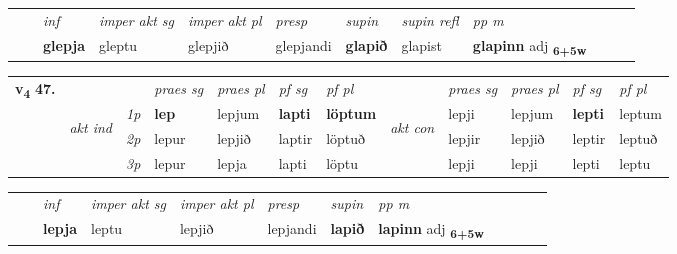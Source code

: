 \begin{tabular}{llllllllllll}
 & & \textit{inf} & \textit{imper akt sg} & \textit{imper akt pl}   & \textit{presp} & \textit{supin} & \textit{supin refl} & \textit{pp m}     \\*
  & & \textbf{glepja} & gleptu  & glepjið   & glepjandi &  \textbf{glapið} & glapist & \textbf{glapinn} adj \textbf{\textsubscript{6+5w}} \\*
\cmidrule{1-12}
\end{tabular}



\begin{tabular}{llllllllllll} \toprule
\multirow{4}{*}{{{\textbf{v{\textsubscript{4}}} \Large{\textbf{47.}}}}}  & &   &  \textit{praes sg}  & \textit{praes pl}  &\textit{ pf sg} & \textit{pf pl} &  &  \textit{praes sg}  & \textit{praes pl}  & \textit{pf sg} & \textit{pf pl } \\*
	\cmidrule{4-7} \cmidrule{9-12}
 & \multirow{3}{*}{\begin{turn}{90}\textit{akt ind}\end{turn}} & {\textit{1p}} & \textbf{lep} & lepjum    & \textbf{lapti} & \textbf{löptum} & \multirow{3}{*}{\begin{turn}{90}\textit{akt con}\end{turn}} &lepji & lepjum & \textbf{lepti} & leptum\\*
& &  {\textit{2p}} &  lepur  & lepjið   & laptir & löptuð & & lepjir & lepjið & leptir & leptuð \\*
& &  {\textit{3p}} & lepur & lepja   & lapti & löptu & & lepji & lepji& lepti & leptu  \\*
\cmidrule{4-7} \cmidrule{9-12}
\end{tabular}


\begin{tabular}{llllllllllll}
 & & \textit{inf} & \textit{imper akt sg} & \textit{imper akt pl}   & \textit{presp} & \textit{supin}  & \textit{pp m}     \\*
  & & \textbf{lepja} & leptu  & lepjið   & lepjandi &  \textbf{lapið}  & \textbf{lapinn} adj \textbf{\textsubscript{6+5w}} \\*
\cmidrule{1-12}
\end{tabular}



